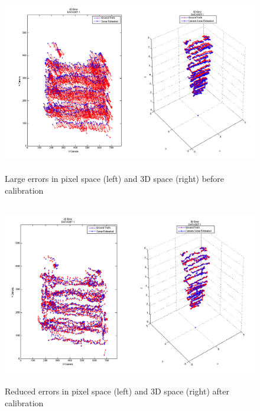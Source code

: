 \documentclass[15pt]{article}
\begin{document}
\begin{figure}[!htbp]
  \includegraphics[width=\textwidth,height=8cm]{1}
  \caption{Large errors in pixel space (left) and 3D space (right) before calibration}
\end{figure}

\begin{figure}[!htbp]
  \includegraphics[width=\textwidth,height=8cm]{4}
  \caption{Reduced errors in pixel space (left) and 3D space (right) after calibration}
\end{figure}
\end{document}

